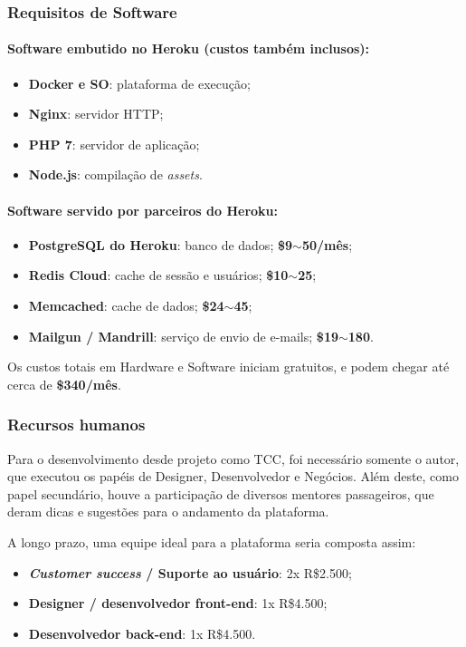 \documentclass[12pt,a4paper,twoside,hyphens,english,brazil]{abntex2}
\begin{document}
\subsubsection*{Requisitos de Software}
\paragraph*{Software embutido no Heroku (custos também inclusos):}
\begin{itemize}
	\item \textbf{Docker e SO}: plataforma de execução;
	\item \textbf{Nginx}: servidor HTTP;
	\item \textbf{PHP 7}: servidor de aplicação;
	\item \textbf{Node.js}: compilação de \emph{assets}.
\end{itemize}

\paragraph*{Software servido por parceiros do Heroku:}
\begin{itemize}
	\item \textbf{PostgreSQL do Heroku}: banco de dados; \textbf{\$9$\sim$50/mês};
	\item \textbf{Redis Cloud}: cache de sessão e usuários; \textbf{\$10$\sim$25};
	\item \textbf{Memcached}: cache de dados; \textbf{\$24$\sim$45};
	\item \textbf{Mailgun / Mandrill}: serviço de envio de e-mails; \textbf{\$19$\sim$180}.
\end{itemize}

Os custos totais em Hardware e Software iniciam gratuitos, e podem chegar até cerca de \textbf{\$340/mês}.

\subsubsection*{Recursos humanos}
Para o desenvolvimento desde projeto como TCC, foi necessário somente o autor, que executou os papéis de Designer, Desenvolvedor e Negócios. Além deste, como papel secundário, houve a participação de diversos mentores passageiros, que deram dicas e sugestões para o andamento da plataforma.

A longo prazo, uma equipe ideal para a plataforma seria composta assim:
\begin{itemize}
	\item \textbf{\emph{Customer success} / Suporte ao usuário}: 2x R\$2.500;
	\item \textbf{Designer / desenvolvedor front-end}: 1x R\$4.500;
	\item \textbf{Desenvolvedor back-end}: 1x R\$4.500.
\end{itemize}
\end{document}
